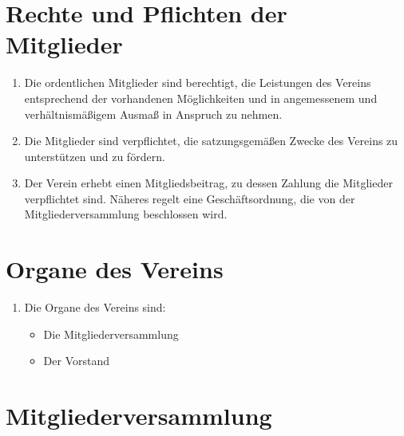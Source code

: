 \documentclass[fontsize=12pt,paper=a4,pagesize]{scrartcl}
\begin{document}
\section{Rechte und Pflichten der Mitglieder}

\begin{enumerate}
	\item Die ordentlichen Mitglieder sind berechtigt, die Leistungen des
		Vereins entsprechend der vorhandenen Möglichkeiten und in angemessenem
		und verhältnismäßigem Ausmaß in Anspruch zu nehmen.

	\item Die Mitglieder sind verpflichtet, die satzungsgemäßen Zwecke des
		Vereins zu unterstützen und zu fördern.

	\item Der Verein erhebt einen Mitgliedsbeitrag, zu dessen Zahlung die
		Mitglieder verpflichtet sind. Näheres regelt eine Geschäftsordnung,
		die von der Mitgliederversammlung beschlossen wird.

\end{enumerate}

\section{Organe des Vereins}

\begin{enumerate}
	\item Die Organe des Vereins sind:
		\begin{itemize}
			\item Die Mitgliederversammlung
			\item Der Vorstand
		\end{itemize}
\end{enumerate}

\section{Mitgliederversammlung}
\end{document}
